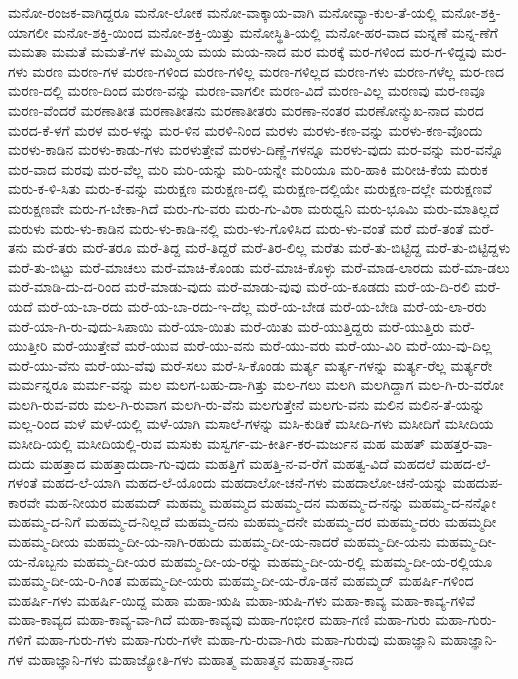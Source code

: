 {ಮನೋ-ರಂಜಕ-ವಾಗಿದ್ದರೂ
ಮನೋ-ಲೋಕ
ಮನೋ-ವಾಕ್ಕಾಯ-ವಾಗಿ
ಮನೋವ್ಯಾ-ಕುಲ-ತೆ-ಯಲ್ಲಿ
ಮನೋ-ಶಕ್ತಿ-ಯಾಗಲೀ
ಮನೋ-ಶಕ್ತಿ-ಯಿಂದ
ಮನೋ-ಶಕ್ತಿ-ಯಿತ್ತು
ಮನೋಸ್ಥಿತಿ-ಯಲ್ಲಿ
ಮನೋ-ಹರ-ವಾದ
ಮನ್ನಣೆ
ಮನ್ನ-ಣೆಗೆ
ಮಮತಾ
ಮಮತೆ
ಮಮತೆ-ಗಳ
ಮಮ್ಮಿಯ
ಮಯ
ಮಯ-ನಾದ
ಮರ
ಮರಕ್ಕೆ
ಮರ-ಗಳಿಂದ
ಮರ-ಗ-ಳಿದ್ದವು
ಮರ-ಗಳು
ಮರಣ
ಮರಣ-ಗಳ
ಮರಣ-ಗಳಿಂದ
ಮರಣ-ಗಳಿಲ್ಲ
ಮರಣ-ಗಳಿಲ್ಲದ
ಮರಣ-ಗಳು
ಮರಣ-ಗಳೆಲ್ಲ
ಮರ-ಣದ
ಮರಣ-ದಲ್ಲಿ
ಮರಣ-ದಿಂದ
ಮರಣ-ವನ್ನು
ಮರಣ-ವಾಗಲೀ
ಮರಣ-ವಿದೆ
ಮರಣ-ವಿಲ್ಲ
ಮರಣವು
ಮರ-ಣವೂ
ಮರಣ-ವೆಂದರೆ
ಮರಣಾತೀತ
ಮರಣಾತೀತನು
ಮರಣಾತೀತರು
ಮರಣಾ-ನಂತರ
ಮರಣೋನ್ಮುಖ-ನಾದ
ಮರದ
ಮರದ-ಕೆ-ಳಗೆ
ಮರಳ
ಮರ-ಳನ್ನು
ಮರ-ಳಿನ
ಮರಳಿ-ನಿಂದ
ಮರಳು
ಮರಳು-ಕಣ-ವನ್ನು
ಮರಳು-ಕಣ-ವೊಂದು
ಮರಳು-ಕಾಡಿನ
ಮರಳು-ಕಾಡು-ಗಳು
ಮರಳುತ್ತೇವೆ
ಮರಳು-ದಿಣ್ಣೆ-ಗಳನ್ನೂ
ಮರಳು-ವುದು
ಮರ-ವನ್ನು
ಮರ-ವನ್ನೊ
ಮರ-ವಾದ
ಮರವು
ಮರ-ವೆಲ್ಲ
ಮರಿ
ಮರಿ-ಯನ್ನು
ಮರಿ-ಯನ್ನೇ
ಮರಿಯೂ
ಮರಿ-ಹಾಕಿ
ಮರೀಚಿ-ಕೆಯ
ಮರುಕ
ಮರು-ಕ-ಳಿ-ಸಿತು
ಮರು-ಕ-ವನ್ನು
ಮರುಕ್ಷಣ
ಮರುಕ್ಷಣ-ದಲ್ಲಿ
ಮರುಕ್ಷಣ-ದಲ್ಲಿಯೇ
ಮರುಕ್ಷಣ-ದಲ್ಲೇ
ಮರುಕ್ಷಣವೆ
ಮರುಕ್ಷಣವೇ
ಮರು-ಗ-ಬೇಕಾ-ಗಿದೆ
ಮರು-ಗು-ವರು
ಮರು-ಗು-ವಿರಾ
ಮರುಧ್ವನಿ
ಮರು-ಭೂಮಿ
ಮರು-ಮಾತಿಲ್ಲದೆ
ಮರುಳು
ಮರು-ಳು-ಕಾಡಿನ
ಮರು-ಳು-ಕಾಡಿ-ನಲ್ಲಿ
ಮರು-ಳು-ಗೊಳಿಸಿದ
ಮರು-ಳು-ವಂತೆ
ಮರೆ
ಮರೆ-ತಂತೆ
ಮರೆ-ತನು
ಮರೆ-ತರು
ಮರೆ-ತರೂ
ಮರೆ-ತಿದ್ದ
ಮರೆ-ತಿದ್ದರೆ
ಮರೆ-ತಿರ-ಲಿಲ್ಲ
ಮರೆತು
ಮರೆ-ತು-ಬಿಟ್ಟಿದ್ದ
ಮರೆ-ತು-ಬಿಟ್ಟಿದ್ದಳು
ಮರೆ-ತು-ಬಿಟ್ಟು
ಮರೆ-ಮಾಚಲು
ಮರೆ-ಮಾಚಿ-ಕೊಂಡು
ಮರೆ-ಮಾಚಿ-ಕೊಳ್ಳು
ಮರೆ-ಮಾಡ-ಲಾರದು
ಮರೆ-ಮಾ-ಡಲು
ಮರೆ-ಮಾಡಿ-ದು-ದ-ರಿಂದ
ಮರೆ-ಮಾಡು-ವುದು
ಮರೆ-ಮಾಡು-ವುವು
ಮರೆ-ಯ-ಕೂಡದು
ಮರೆ-ಯ-ದಿ-ರಲಿ
ಮರೆ-ಯದೆ
ಮರೆ-ಯ-ಬಾ-ರದು
ಮರೆ-ಯ-ಬಾ-ರದು-ಇ-ದೆಲ್ಲ
ಮರೆ-ಯ-ಬೇಡ
ಮರೆ-ಯ-ಬೇಡಿ
ಮರೆ-ಯ-ಲಾ-ರರು
ಮರೆ-ಯಾ-ಗಿ-ರು-ವುದು-ಸಿಪಾಯಿ
ಮರೆ-ಯಾ-ಯಿತು
ಮರೆ-ಯಿತು
ಮರೆ-ಯುತ್ತಿದ್ದರು
ಮರೆ-ಯುತ್ತಿರು
ಮರೆ-ಯುತ್ತೀರಿ
ಮರೆ-ಯುತ್ತೇವೆ
ಮರೆ-ಯುವ
ಮರೆ-ಯು-ವನು
ಮರೆ-ಯು-ವರು
ಮರೆ-ಯು-ವಿರಿ
ಮರೆ-ಯು-ವು-ದಿಲ್ಲ
ಮರೆ-ಯು-ವೆನು
ಮರೆ-ಯು-ವೆವು
ಮರೆ-ಸಲು
ಮರೆ-ಸಿ-ಕೊಂಡು
ಮರ್ತ್ಯ
ಮರ್ತ್ಯ-ಗಳನ್ನು
ಮರ್ತ್ಯ-ರೆಲ್ಲ
ಮರ್ತ್ಯರೇ
ಮರ್ಮನ್ನರೂ
ಮರ್ಮ-ವನ್ನು
ಮಲ
ಮಲಗ-ಬಹು-ದಾ-ಗಿತ್ತು
ಮಲ-ಗಲು
ಮಲಗಿ
ಮಲಗಿದ್ದಾಗ
ಮಲ-ಗಿ-ರು-ವರೋ
ಮಲಗಿ-ರುವ-ವರು
ಮಲ-ಗಿ-ರುವಾಗ
ಮಲಗಿ-ರು-ವೆನು
ಮಲಗುತ್ತೇನೆ
ಮಲಗು-ವನು
ಮಲಿನ
ಮಲಿನ-ತೆ-ಯನ್ನು
ಮಲ್ಲ-ರಿಂದ
ಮಳೆ
ಮಳೆ-ಯಲ್ಲಿ
ಮಳೆ-ಯಾಗಿ
ಮಸಾಲೆ-ಗಳನ್ನು
ಮಸಿ-ಕುಡಿಕೆ
ಮಸೀದಿ-ಗಳು
ಮಸೀದಿಗೆ
ಮಸೀದಿಯ
ಮಸೀದಿ-ಯಲ್ಲಿ
ಮಸೀದಿಯಲ್ಲಿ-ರುವ
ಮಸುಕು
ಮಸ್ವರ್ಗ-ಮ-ಕೀರ್ತಿ-ಕರ-ಮರ್ಜುನ
ಮಹ
ಮಹತ್
ಮಹತ್ತರ-ವಾ-ದುದು
ಮಹತ್ತಾದ
ಮಹತ್ತಾದುದಾ-ಗು-ವುದು
ಮಹತ್ತಿಗೆ
ಮಹತ್ತಿ-ನ-ವ-ರೆಗೆ
ಮಹತ್ವ-ವಿದೆ
ಮಹದಲೆ
ಮಹದ-ಲೆ-ಗಳಂತೆ
ಮಹದ-ಲೆ-ಯಾಗಿ
ಮಹದ-ಲೆ-ಯೊಂದು
ಮಹದಾಲೋ-ಚನೆ-ಗಳು
ಮಹದಾಲೋ-ಚನೆ-ಯನ್ನು
ಮಹದುಪ-ಕಾರವೇ
ಮಹ-ನೀಯರ
ಮಹಮದ್
ಮಹಮ್ಮ
ಮಹಮ್ಮದ
ಮಹಮ್ಮ-ದನ
ಮಹಮ್ಮ-ದ-ನನ್ನು
ಮಹಮ್ಮ-ದ-ನನ್ನೋ
ಮಹಮ್ಮ-ದ-ನಿಗೆ
ಮಹಮ್ಮ-ದ-ನಿಲ್ಲದೆ
ಮಹಮ್ಮ-ದನು
ಮಹಮ್ಮ-ದನೇ
ಮಹಮ್ಮ-ದರ
ಮಹಮ್ಮ-ದರು
ಮಹಮ್ಮದೀ
ಮಹಮ್ಮ-ದೀಯ
ಮಹಮ್ಮ-ದೀ-ಯ-ನಾಗಿ-ರಹುದು
ಮಹಮ್ಮ-ದೀ-ಯ-ನಾದರೆ
ಮಹಮ್ಮ-ದೀ-ಯನು
ಮಹಮ್ಮ-ದೀ-ಯ-ನೊಬ್ಬನು
ಮಹಮ್ಮ-ದೀ-ಯರ
ಮಹಮ್ಮ-ದೀ-ಯ-ರನ್ನು
ಮಹಮ್ಮ-ದೀ-ಯ-ರಲ್ಲಿ
ಮಹಮ್ಮ-ದೀ-ಯ-ರಲ್ಲಿಯೂ
ಮಹಮ್ಮ-ದೀ-ಯ-ರಿ-ಗಿಂತ
ಮಹಮ್ಮ-ದೀ-ಯರು
ಮಹಮ್ಮ-ದೀ-ಯ-ರೊ-ಡನೆ
ಮಹಮ್ಮದ್
ಮಹರ್ಷಿ-ಗಳಿಂದ
ಮಹರ್ಷಿ-ಗಳು
ಮಹರ್ಷಿ-ಯಿದ್ದ
ಮಹಾ
ಮಹಾ-ಋಷಿ
ಮಹಾ-ಋಷಿ-ಗಳು
ಮಹಾ-ಕಾವ್ಯ
ಮಹಾ-ಕಾವ್ಯ-ಗಳಿವೆ
ಮಹಾ-ಕಾವ್ಯದ
ಮಹಾ-ಕಾವ್ಯ-ವಾ-ಗಿದೆ
ಮಹಾ-ಕಾವ್ಯವು
ಮಹಾ-ಗಂಭೀರ
ಮಹಾ-ಗಣಿ
ಮಹಾ-ಗುರು
ಮಹಾ-ಗುರು-ಗಳಿಗೆ
ಮಹಾ-ಗುರು-ಗಳು
ಮಹಾ-ಗುರು-ಗಳೇ
ಮಹಾ-ಗು-ರುವಾ-ಗಿರು
ಮಹಾ-ಗುರುವು
ಮಹಾಜ್ಞಾನಿ
ಮಹಾಜ್ಞಾನಿ-ಗಳ
ಮಹಾಜ್ಞಾನಿ-ಗಳು
ಮಹಾಜ್ಯೋತಿ-ಗಳು
ಮಹಾತ್ಮ
ಮಹಾತ್ಮನ
ಮಹಾತ್ಮ-ನಾದ
}
